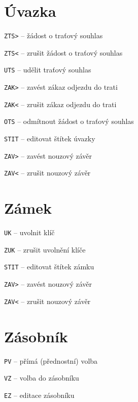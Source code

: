 \documentclass[12pt,a4paper,landscape]{article}
\begin{document}
\begin{multicols}{3}
\section{Úvazka}
\begin{compactitem}
	\item \texttt{ZTS>} -- žádost o traťový souhlas
	\item \texttt{ZTS<} -- zrušit žádost o traťový souhlas
	\item \texttt{UTS} -- udělit traťový souhlas
	\item \texttt{ZAK>} -- zavést zákaz odjezdu do trati
	\item \texttt{ZAK<} -- zrušit zákaz odjezdu do trati
	\item \texttt{OTS} -- odmítnout žádost o traťový souhlas
	\item \texttt{STIT} -- editovat štítek úvazky
	\item \texttt{ZAV>} -- zavést nouzový závěr
	\item \texttt{ZAV<} -- zrušit nouzový závěr	
\end{compactitem}

\section{Zámek}
\begin{compactitem}
	\item \texttt{UK} -- uvolnit klíč
	\item \texttt{ZUK} -- zrušit uvolnění klíče
	\item \texttt{STIT} -- editovat štítek zámku
	\item \texttt{ZAV>} -- zavést nouzový závěr
	\item \texttt{ZAV<} -- zrušit nouzový závěr		
\end{compactitem}

\section{Zásobník}
\begin{compactitem}
	\item \texttt{PV} -- přímá (přednostní) volba
	\item \texttt{VZ} -- volba do zásobníku
	\item \texttt{EZ} -- editace zásobníku
\end{compactitem}

\end{multicols}
\end{document}
